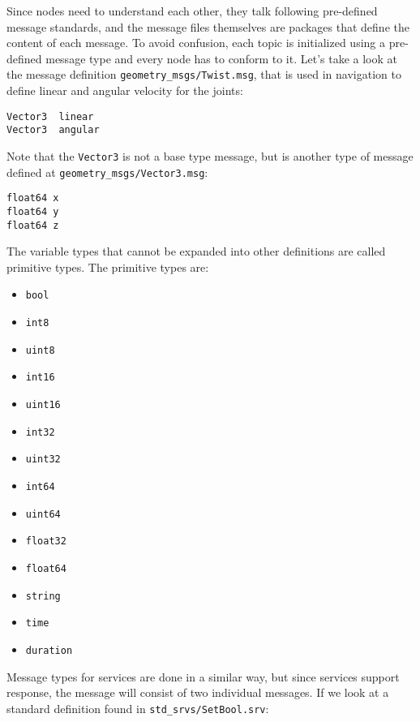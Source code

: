 Since nodes need to understand each other, they talk following pre-defined message standards, and the message files themselves are packages that define the content of each message. To avoid confusion, each topic is initialized using a pre-defined message type and every node has to conform to it. Let's take a look at the message definition \texttt{geometry\_msgs/Twist.msg}, that is used in navigation to define linear and angular velocity for the joints:

\begin{lstlisting}
Vector3  linear
Vector3  angular
\end{lstlisting}

Note that the \texttt{Vector3} is not a base type message, but is another type of message defined at \texttt{geometry\_msgs/Vector3.msg}:

\begin{lstlisting}
float64 x
float64 y
float64 z
\end{lstlisting}

The variable types that cannot be expanded into other definitions are called primitive types. The primitive types are:

\begin{multicols}{3}
    \begin{itemize}
        \item \texttt{bool}
        \item \texttt{int8}
        \item \texttt{uint8}
        \item \texttt{int16}
        \item \texttt{uint16}
        \item \texttt{int32}
        \item \texttt{uint32}
        \item \texttt{int64}
        \item \texttt{uint64}
        \item \texttt{float32}
        \item \texttt{float64}
        \item \texttt{string}
        \item \texttt{time}
        \item \texttt{duration}
    \end{itemize}
\end{multicols}

Message types for services are done in a similar way, but since services support response, the message will consist of two individual messages. If we look at a standard definition found in \texttt{std\_srvs/SetBool.srv}:

